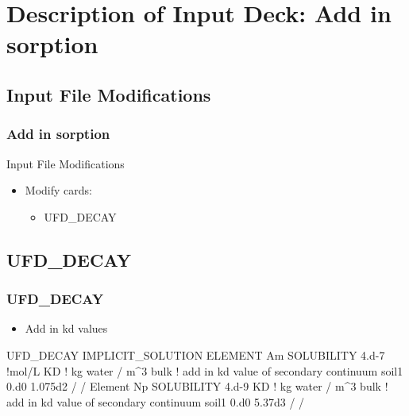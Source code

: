 \documentclass{beamer}
\newcommand\bluecomment[1]{{{\color{blue} #1}}}
\newcommand\magentacomment[1]{{{\color{magenta} #1}}}
\begin{document}
\section{Description of Input Deck: Add in sorption}

\subsection{Input File Modifications}

\begin{frame}[fragile]\frametitle{Add in sorption}
	
	Input File Modifications
	\begin{itemize}
		\item Modify cards:
		\begin{itemize}
			\item UFD\_DECAY
		\end{itemize}
	\end{itemize}
	
\end{frame}


\subsection{UFD\_DECAY}

\begin{frame}[fragile]\frametitle{UFD\_DECAY}
	
	\begin{itemize}
		\item Add in kd values
	\end{itemize}
	
	\begin{semiverbatim}
UFD_DECAY
  IMPLICIT_SOLUTION
  ELEMENT Am
    SOLUBILITY 4.d-7 \bluecomment{!mol/L}
    KD \bluecomment{! kg water / m^3 bulk}
    \bluecomment{! add in kd value of secondary continuum}
      soil1 0.d0 \magentacomment{1.075d2}
    /
  /
  Element Np
    SOLUBILITY 4.d-9
    KD \bluecomment{! kg water / m^3 bulk}
    \bluecomment{! add in kd value of secondary continuum}
      soil1 0.d0 \magentacomment{5.37d3}
    /
  /
		
	\end{semiverbatim}
	
\end{frame}

\end{document}

